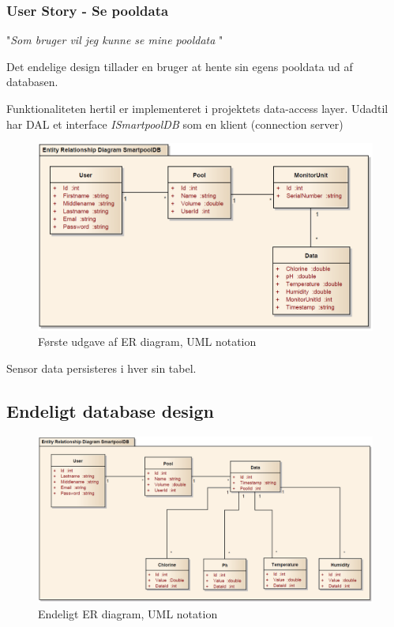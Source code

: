 \subsubsection{User Story - Se pooldata}

"\textit{Som bruger vil jeg kunne se mine pooldata }"

Det endelige design tillader en bruger at hente sin egens pooldata ud af databasen.

Funktionaliteten hertil er implementeret i projektets data-access layer. Udadtil har DAL et interface \textit{ISmartpoolDB} som en klient (connection server)



\begin{figure}
	\centering
	\includegraphics[width=\linewidth]{figs/design/databaseERD_old_uml}
	\caption{Første udgave af ER diagram, UML notation}
	\label{fig:databaseERD_old_uml}
\end{figure}

Sensor data persisteres i hver sin tabel.

\subsection{Endeligt database design}

\begin{figure}
\centering
\includegraphics[width=\linewidth]{figs/design/databaseERD_final_uml}
\caption{Endeligt ER diagram, UML notation}
\label{fig:databaseERD_final_uml}
\end{figure}




